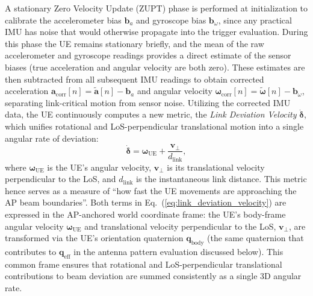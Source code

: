 \documentclass[fleqn,10pt]{wlscirep}
\newcommand{\rev}[1]{{\color{revblue}#1}}
\begin{document}
\rev{A stationary Zero Velocity Update (ZUPT) phase is performed at initialization to calibrate the accelerometer bias $\mathbf{b}_a$ and gyroscope bias $\mathbf{b}_\omega$, since any practical IMU has noise that would otherwise propagate into the trigger evaluation. During this phase the UE remains stationary briefly, and the mean of the raw accelerometer and gyroscope readings provides a direct estimate of the sensor biases (true acceleration and angular velocity are both zero). These estimates are then subtracted from all subsequent IMU readings to obtain corrected acceleration $\mathbf{a}_{\text{corr}}[n] = \tilde{\mathbf{a}}[n] - \mathbf{b}_a$ and angular velocity $\boldsymbol{\omega}_{\text{corr}}[n] = \tilde{\boldsymbol{\omega}}[n] - \mathbf{b}_\omega$, separating link-critical motion from sensor noise. Utilizing the corrected IMU data, the UE continuously computes a new metric, the \emph{Link Deviation Velocity} $\dot{\boldsymbol{\delta}}$, which unifies rotational and LoS-perpendicular translational motion into a single angular rate of deviation:}
\begin{equation}
    \dot{\boldsymbol{\delta}} = \boldsymbol{\omega}_{\text{UE}} + \frac{\mathbf{v}_{\perp}}{d_{\text{link}}},
    \label{eq:link_deviation_velocity}
\end{equation}
where $\boldsymbol{\omega}_{\text{UE}}$ is the UE's angular velocity, $\mathbf{v}_{\perp}$ is its translational velocity perpendicular to the LoS, and $d_{\text{link}}$ is the instantaneous link distance. This metric hence serves as a measure of ``how fast the UE movements are approaching the AP beam boundaries''. \rev{Both terms in Eq.~(\ref{eq:link_deviation_velocity}) are expressed in the AP-anchored world coordinate frame: the UE's body-frame angular velocity $\boldsymbol{\omega}_{\text{UE}}$ and translational velocity perpendicular to the LoS, $\mathbf{v}_{\perp}$, are transformed via the UE's orientation quaternion $\mathbf{q}_{\text{body}}$ (the same quaternion that contributes to $\mathbf{q}_{\text{eff}}$ in the antenna pattern evaluation discussed below). This common frame ensures that rotational and LoS-perpendicular translational contributions to beam deviation are summed consistently as a single 3D angular rate.}
\end{document}
